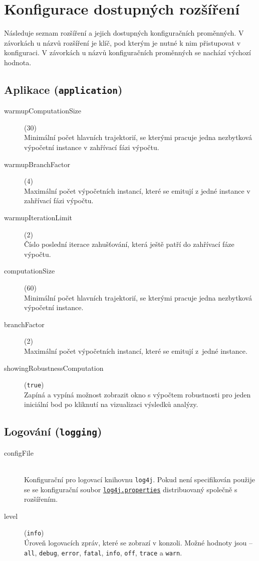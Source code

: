 \chapter{Konfigurace dostupných rozšíření}\label{appendix:extensions}

Následuje seznam rozšíření a jejich dostupných konfiguračních proměnných. V závorkách
u názvů rozšíření je klíč, pod kterým je nutné k nim přistupovat v konfiguraci.
V závorkách u názvů konfiguračních proměnných se nachází výchozí hodnota.

\section{Aplikace (\texttt{application})}

\begin{description}
	\item[warmupComputationSize] (30) \\
		Minimální počet hlavních trajektorií, se kterými pracuje jedna nezbytková výpočetní instance v zahřívací fázi výpočtu.
	\item[warmupBranchFactor] (4) \\
		Maximální počet výpočetních instancí, které se emitují z jedné instance v zahřívací fázi výpočtu.
	\item[warmupIterationLimit] (2) \\
		Číslo poslední iterace zahušťování, která ještě patří do zahřívací fáze výpočtu.
	\item[computationSize] (60) \\
		Minimální počet hlavních trajektorií, se kterými pracuje jedna nezbytková výpočetní instance.
	\item[branchFactor] (2) \\
		Maximální počet výpočetních instancí, které se emitují z~jedné instance.
	\item[showingRobustnessComputation] (\texttt{true}) \\
		Zapíná a vypíná možnost zobrazit okno s výpočtem robustnosti pro jeden iniciální bod po kliknutí na vizualizaci výsledků analýzy.
\end{description}

\section{Logování (\texttt{logging})}

\begin{description}
	\item[configFile] ~\\
		Konfigurační pro logovací knihovnu \texttt{log4j}. Pokud není specifikován použije se se konfigurační soubor \href{https://github.com/sybila/parasim/blob/2.0.0.Final/core/src/main/resources/org/sybila/parasim/log4j/log4j.properties}{\texttt{log4j.properties}} distribuovaný společně s rozšířením.
	\item[level] (\texttt{info}) \\
		Úroveň logovacích zpráv, které se zobrazí v konzoli. Možné hodnoty jsou -- \texttt{all}, \texttt{debug}, \texttt{error}, \texttt{fatal}, \texttt{info}, \texttt{off}, \texttt{trace} a \texttt{warn}.
\end{description}


